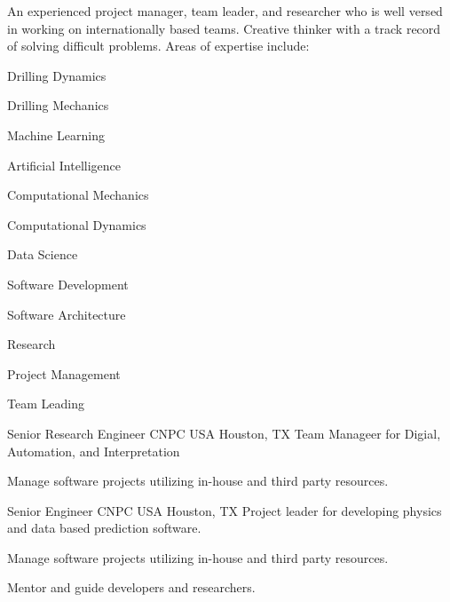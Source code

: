 \documentclass{leresume}
\begin{document}
	\thispagestyle{leempty}
	\makeresumeheaderC

	An experienced project manager, team leader, and researcher who is well versed in working on internationally based teams. Creative thinker with a track record of solving difficult problems. Areas of expertise include:
	\vspace{-6pt}
	\begin{multicols}{3}
		\begin{bulletedlist}
			
			\item Drilling Dynamics
			\item Drilling Mechanics
			\item Machine Learning
			\item Artificial Intelligence
			\item Computational Mechanics
			\item Computational Dynamics
			\item Data Science
			\item Software Development
			\item Software Architecture
			\item Research
			\item Project Management
			\item Team Leading
		\end{bulletedlist}
		\end{multicols}

	
		
            {Senior Research Engineer}
            {CNPC USA}
			{Houston, TX}
			Team Manageer for Digial, Automation, and Interpretation
		\begin{bulletedlist}
			
		\item
		
				Manage software projects utilizing in-house and third party resources.
			
		\end{bulletedlist}
	
            {Senior Engineer}
            {CNPC USA}
			{Houston, TX}
			Project leader for developing physics and data based prediction software.
		\begin{bulletedlist}
			
		\item
		
				Manage software projects utilizing in-house and third party resources.
			
		\item
		
				Mentor and guide developers and researchers.
			
		\end{bulletedlist}
	
\end{document}
